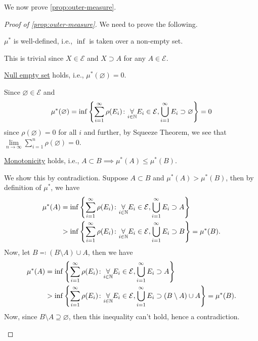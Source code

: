 We now prove \autoref{prop:outer-measure}.
\begin{proof}[Proof of \autoref{prop:outer-measure}]
	We need to prove the following.

	\begin{claim}
		\(\mu ^{*} \) is well-defined, i.e., \(\inf\) is taken over a non-empty set.
	\end{claim}
	\begin{explanation}
		This is trivial since \(X\in \mathcal{E}\) and \(X\supset A\) for any \(A\in \mathcal{E}\).
	\end{explanation}

	\begin{claim}
		\hyperref[def:outer-measure-null-empty-set]{Null empty set} holds, i.e., \(\mu ^{*} (\varnothing ) = 0\).
	\end{claim}
	\begin{explanation}
		Since \(\varnothing \in \mathcal{E}\) and
		\[
			\mu^{*} (\varnothing ) = \inf \left\{\sum\limits_{i=1}^{\infty} \rho(E_{i})\colon \underset{i\in \mathbb{\MakeUppercase{N}} }{\forall}E_{i}\in \mathcal{E} , \bigcup\limits_{i=1}^{\infty} E_{i}\supset \varnothing \right\} = 0
		\]
		since \(\rho(\varnothing ) = 0\) for all \(i\) and further, by Squeeze Theorem, we see that \(\lim\limits_{n \to \infty} \sum\limits_{i=1}^{n} \rho(\varnothing) = 0\).
	\end{explanation}

	\begin{claim}
		\hyperref[def:outer-measure-montonicity]{Monotonicity} holds, i.e., \(A\subset B\implies \mu^{*} (A)\leq \mu^{*} (B)\).
	\end{claim}
	\begin{explanation}
		We show this by contradiction. Suppose \(A\subset B\) and \(\mu^{*} (A)>  \mu^{*} (B)\), then by
		definition of \(\mu^{*} \), we have
		\[
			\begin{split}
				\mu^{*} (A) &= \inf\left\{\sum\limits_{i=1}^{\infty} \rho(E_{i})\colon \underset{i\in\mathbb{\MakeUppercase{N}}}{\forall}E_{i}\in \mathcal{E},\bigcup\limits_{i=1}^{\infty} E_{i}\supset A \right\}\\
				&>\inf\left\{\sum\limits_{i=1}^{\infty} \rho(E_{i})\colon \underset{i\in\mathbb{\MakeUppercase{N}}}{\forall}E_{i}\in \mathcal{E},\bigcup\limits_{i=1}^{\infty} E_{i}\supset B \right\} = \mu^{*} (B).
			\end{split}
		\]
		Now, let \(B \eqqcolon (B\setminus A)\cup A\), then we have
		\[
			\begin{split}
				\mu^{*} (A) &= \inf\left\{\sum\limits_{i=1}^{\infty} \rho(E_{i})\colon \underset{i\in\mathbb{\MakeUppercase{N}}}{\forall}E_{i}\in \mathcal{E},\bigcup\limits_{i=1}^{\infty} E_{i}\supset A \right\}\\
				&>\inf\left\{\sum\limits_{i=1}^{\infty} \rho(E_{i})\colon \underset{i\in\mathbb{\MakeUppercase{N}}}{\forall}E_{i}\in \mathcal{E},\bigcup\limits_{i=1}^{\infty} E_{i}\supset (B\setminus A)\cup A \right\} = \mu^{*} (B).
			\end{split}
		\]
		Now, since \(B\setminus A\supseteq \varnothing \), then this inequality can't hold, hence a contradiction\conta.
	\end{explanation}


\end{proof}
